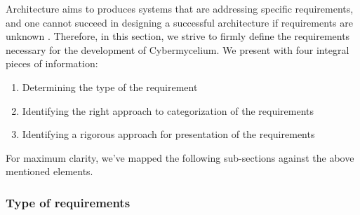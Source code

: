 \documentclass[review]{elsarticle}
\begin{document}
Architecture aims to produces systems that are addressing specific requirements, and one cannot succeed in designing a successful architecture if requirements are unknown \cite{SoftwareArchitectureKazman}. Therefore, in this section, we strive to firmly define the requirements necessary for the development of Cybermycelium. We present with four integral pieces of information: 

\begin{enumerate}
    \item Determining the type of the requirement 
    \item Identifying the right approach to categorization of the requirements 
    \item Identifying a rigorous approach for presentation of the requirements 
\end{enumerate}

For maximum clarity, we've mapped the following sub-sections against the above mentioned elements. 



\subsubsection{Type of requirements}
\end{document}
